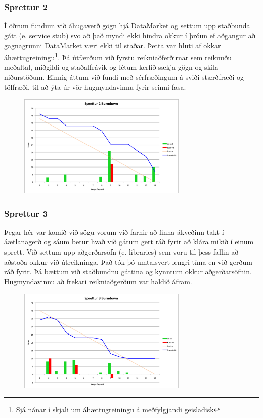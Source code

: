 \documentclass{article}
\begin{document}
\subsubsection{Sprettur 2}
Í öðrum fundum við áhugaverð gögn hjá DataMarket og settum upp staðbunda
gátt (e. service stub) svo að það myndi ekki hindra okkur í þróun ef 
aðgangur að gagnagrunni DataMarket væri ekki til staðar. Þetta var hluti af
okkar áhættugreiningu\footnote[1]{Sjá nánar í skjali um áhættugreiningu á meðfylgjandi geisladisk}. 
Þá útfærðum við fyrstu reikniaðferðirnar sem reiknuðu meðaltal, miðgildi og staðalfrávik
og létum kerfið sækja gögn og skila niðurstöðum.
Einnig áttum við fundi með sérfræðingum á sviði stærðfræði og tölfræði, til að ýta
úr vör hugmyndavinnu fyrir seinni fasa.
\begin{figure}[H]
 \centering
 \includegraphics[width=0.72\textwidth]{Sprettur2_Burndown.png}
 \caption{}
\end{figure}
\label{fig:sp2}
\subsubsection{Sprettur 3}
Þegar hér var komið við sögu vorum við farnir að finna ákveðinn takt í
áætlanagerð og sáum betur hvað við gátum gert ráð fyrir að klára mikið 
í einum sprett. Við settum upp aðgerðarsöfn (e. libraries) sem voru til þess fallin að
aðstoða okkur við útreikninga. Það tók þó umtalsvert lengri tíma en við gerðum
ráð fyrir. Þá bættum við staðbundnu gáttina og kynntum okkur aðgerðarsöfnin.
Hugmyndavinnu að frekari reikniaðgerðum var haldið áfram.
\begin{figure}[H]
 \centering
 \includegraphics[width=0.72\textwidth]{Sprettur3_Burndown.png}
 \caption{}
\end{figure}
\label{fig:sp3}
\end{document}
